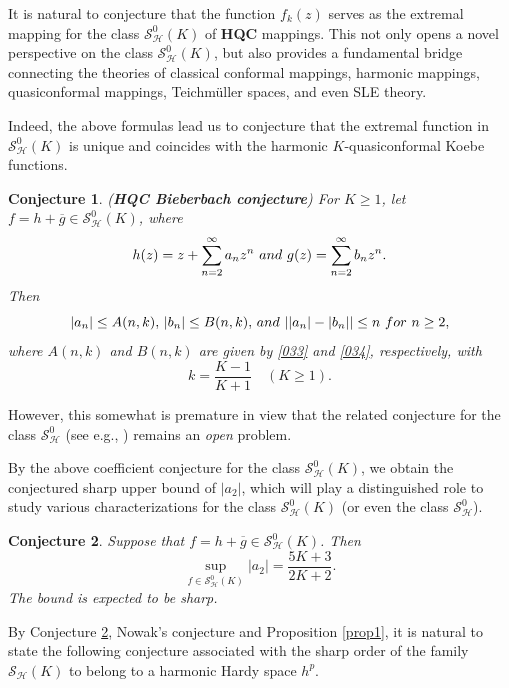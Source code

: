 \documentclass[11pt, reqno]{amsart}
\newtheorem{con}{Conjecture}
\newtheorem{rem}{Remark}
\numberwithin{equation}{section}
\newcommand{\abs}[1]{\left\vert#1\right\vert}
\begin{document}

It is natural to conjecture that the function $f_k(z)$ serves as the extremal mapping for the class $\mathcal{S}^0_\mathcal{H}(K)$ of \textbf{HQC} mappings. This not only opens a novel perspective on the class $\mathcal{S}^0_\mathcal{H}(K)$, but also provides a fundamental bridge connecting the theories of classical conformal mappings, harmonic mappings, quasiconformal mappings, Teichmüller spaces, and even SLE theory.

Indeed, the above formulas lead us to conjecture that the extremal function in $\mathcal{S}^0_\mathcal{H}(K)$ is unique and coincides with the harmonic $K$-quasiconformal Koebe functions.

\begin{con}\label{conj00}{\rm (\textbf{HQC Bieberbach conjecture})}
 For $K\geq1$, let $f=h+\overline{g}\in {\mathcal{S}_\mathcal{H}^0(K)}$, where $$h(z)=z +\sum_{n=2}^{\infty}a_n z^n\ {\rm and} \ g(z)=\sum_{n=2}^{\infty}b_n z^n.$$ Then 
$$\abs{a_n}\leq A(n,k),\, \abs{b_n}\leq B(n,k),\,{\rm and}\, \abs{\abs{a_n}-\abs{b_n}}\leq n\,\, {\rm for}\,\, n\geq 2,$$
where $A(n,k)$ and $B(n,k)$ are given by \eqref{033} and \eqref{034}, respectively, with $$k=\frac{K-1}{K+1}\quad(K\geq1).$$
\end{con}

However, this somewhat is premature in view that the related conjecture for the class $\mathcal{S}_\mathcal{H}^0$ (see e.g., \cite[pp. 87--88]{d}) remains 
an \textit{open} problem.

By the above coefficient conjecture for the class $\mathcal{S}^0_\mathcal{H}(K)$, we obtain the conjectured sharp upper bound of $\abs{a_2}$, which will play a distinguished role to study various characterizations for the class  $\mathcal{S}^0_\mathcal{H}(K)$ (or even the class $\mathcal{S}^0_\mathcal{H}$). 

\begin{con}\label{conj01}
Suppose that $f=h+\overline{g}\in\mathcal{S}^0_\mathcal{H}(K)$. Then
$$\sup\limits_{f\in\mathcal{S}_\mathcal{H}^0(K)}\abs{a_2}=\frac{5K+3}{2K+2}.$$
The bound is expected to be sharp.
\end{con}



By Conjecture \ref{conj01}, Nowak’s conjecture and Proposition \ref{prop1}, it is natural to state the following conjecture
associated with the sharp order of the family $\mathcal{S}_\mathcal{H}(K)$ to belong to a harmonic Hardy space $h^p$.
\end{document}
